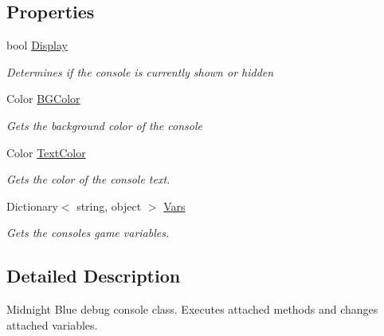\subsection*{Properties}
\begin{DoxyCompactItemize}
\item 
bool \hyperlink{class_midnight_blue_1_1_engine_1_1_m_b_console_aa47a4c245dd21a4cd18a3348119e7757}{Display}
\begin{DoxyCompactList}\small\item\em Determines if the console is currently shown or hidden \end{DoxyCompactList}\item 
Color \hyperlink{class_midnight_blue_1_1_engine_1_1_m_b_console_a159d6456b6408549cab4e96c83ccac74}{B\+G\+Color}
\begin{DoxyCompactList}\small\item\em Gets the background color of the console \end{DoxyCompactList}\item 
Color \hyperlink{class_midnight_blue_1_1_engine_1_1_m_b_console_a4acc1ac4ccea1003f4a0d8f878f91a23}{Text\+Color}
\begin{DoxyCompactList}\small\item\em Gets the color of the console text. \end{DoxyCompactList}\item 
Dictionary$<$ string, object $>$ \hyperlink{class_midnight_blue_1_1_engine_1_1_m_b_console_a504f6353e1d2ad63f4cb471e4107ba50}{Vars}
\begin{DoxyCompactList}\small\item\em Gets the consoles game variables. \end{DoxyCompactList}\end{DoxyCompactItemize}


\subsection{Detailed Description}
Midnight Blue debug console class. Executes attached methods and changes attached variables. 



